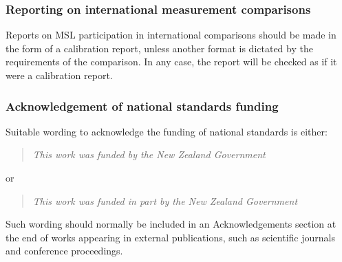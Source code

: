 \subsubsection{Reporting on international measurement comparisons}
Reports on MSL participation in international comparisons should be made in the form of a calibration report, unless another format is dictated by the requirements of the comparison. In any case, the report will be checked as if it were a calibration report.

\subsubsection{Acknowledgement of national standards funding} 
Suitable wording to acknowledge the funding of national standards is either:
\begin{quote}
\textit{This work was funded by the New Zealand Government}
\end{quote}
or
\begin{quote}
\textit{This work was funded in part by the New Zealand Government}
\end{quote}

Such wording should normally be included in an Acknowledgements section at the end of works appearing in external publications, such as scientific journals and conference proceedings.
